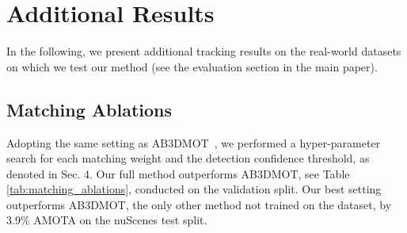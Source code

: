 \section{Additional Results}

In the following, we present additional tracking results on the real-world datasets on which we test our method (see the evaluation section in the main paper).


\begin{table}[t!]
\centering
\caption{\textbf{Tracking Matching and Detection Confidence.} Parameters were optimized on the nuScenes \cite{caesar2020nuscenes} validation set. On the test split our best setting for $w_{iou}$, $w_{center}$, $w_{embbed}$, $\tau_{det}$ surpasses the performance of AB3DMOT \cite{weng2020AB3DMOT}, the only baseline not trained on the dataset.}
\label{tab:matching_ablations}

\end{table}
\subsection{Matching Ablations} Adopting the same setting as AB3DMOT~\cite{weng2020AB3DMOT}, we performed a hyper-parameter search for each matching weight and the detection confidence threshold, as denoted in Sec. 4. Our full method outperforms AB3DMOT, see Table \ref{tab:matching_ablations}, conducted on the validation split. Our best setting outperforms AB3DMOT, the only other method not trained on the dataset, by 3.9\% AMOTA on the nuScenes test split. %



